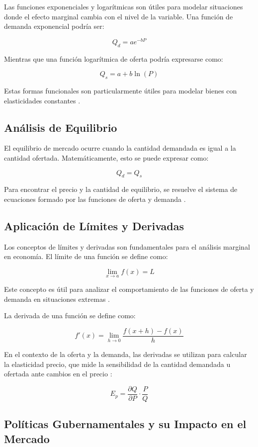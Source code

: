 \documentclass[12pt, a4paper]{article}
\begin{document}
Las funciones exponenciales y logarítmicas son útiles para modelar situaciones donde el efecto marginal cambia con el nivel de la variable. Una función de demanda exponencial podría ser:

\[Q_d = ae^{-bP}\]

Mientras que una función logarítmica de oferta podría expresarse como:

\[Q_s = a + b\ln(P)\]

Estas formas funcionales son particularmente útiles para modelar bienes con elasticidades constantes \parencite{mas2018}.

\subsection{Análisis de Equilibrio}

El equilibrio de mercado ocurre cuando la cantidad demandada es igual a la cantidad ofertada. Matemáticamente, esto se puede expresar como:

\[Q_d = Q_s\]

Para encontrar el precio y la cantidad de equilibrio, se resuelve el sistema de ecuaciones formado por las funciones de oferta y demanda \parencite{varian2014}.

\subsection{Aplicación de Límites y Derivadas}

Los conceptos de límites y derivadas son fundamentales para el análisis marginal en economía. El límite de una función se define como:

\[\lim_{x \to a} f(x) = L\]

Este concepto es útil para analizar el comportamiento de las funciones de oferta y demanda en situaciones extremas \parencite{stewart2012}.

La derivada de una función se define como:

\[f'(x) = \lim_{h \to 0} \frac{f(x+h) - f(x)}{h}\]

En el contexto de la oferta y la demanda, las derivadas se utilizan para calcular la elasticidad precio, que mide la sensibilidad de la cantidad demandada u ofertada ante cambios en el precio \parencite{anton2013}:

\[E_p = \frac{\partial Q}{\partial P} \cdot \frac{P}{Q}\]

\subsection{Políticas Gubernamentales y su Impacto en el Mercado}
\end{document}
